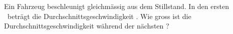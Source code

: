 Ein Fahrzeug beschleunigt gleichmässig aus dem Stillstand. In den ersten \tMaO\ beträgt die Durchschnittsgeschwindigkeit \vMaO. Wie gross ist die Durchschnittsgeschwindigkeit während der nächsten \tMaO?
